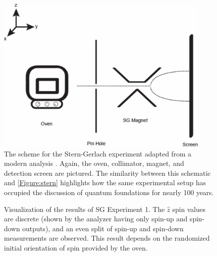 \begin{figure}[!tb]
\centering\CaptionFontSize
\includegraphics[height=3.0in]
{Figure-new-stern}
\caption[Scheme for the Stern-Gerlach experiment from a modern analysis]
  {The scheme for the Stern-Gerlach experiment adapted from a modern analysis \cite{rodriguez}. Again, the oven, collimator, magnet, and detection screen are pictured. The similarity between this schematic and \autoref{Figure:stern} highlights how the same experimental setup has occupied the discussion of quantum foundations for nearly 100 years.}
\label{Figure:new stern}
\end{figure}

\begin{figure}
\centering\CaptionFontSize
{}

\caption[Results of Stern-Gerlach Experiment 1]
{Visualization of the results of SG Experiment 1. The $\hat{z}$ spin values are discrete (shown by the analyzer having only spin-up and spin-down outputs), and an even split of spin-up and spin-down measurements are observed. This result depends on the randomized initial orientation of spin provided by the oven.}
\label{Figure:Exp 1}
\end{figure}

